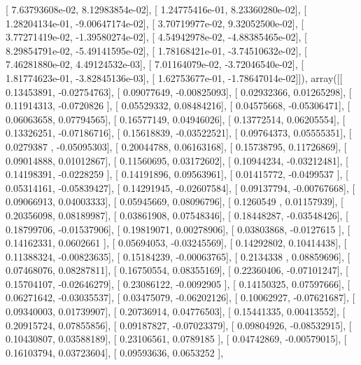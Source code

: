 \documentclass{article}
\begin{document}
       [  7.63793608e-02,   8.12983854e-02],
       [  1.24775416e-01,   8.23360280e-02],
       [  1.28204134e-01,  -9.00647174e-02],
       [  3.70719977e-02,   9.32052500e-02],
       [  3.77271419e-02,  -1.39580274e-02],
       [  4.54942978e-02,  -4.88385465e-02],
       [  8.29854791e-02,  -5.49141595e-02],
       [  1.78168421e-01,  -3.74510632e-02],
       [  7.46281880e-02,   4.49124532e-03],
       [  7.01164079e-02,  -3.72046540e-02],
       [  1.81774623e-01,  -3.82845136e-03],
       [  1.62753677e-01,  -1.78647014e-02]]), array([[ 0.13453891, -0.02754763],
       [ 0.09077649, -0.00825093],
       [ 0.02932366,  0.01265298],
       [ 0.11914313, -0.0720826 ],
       [ 0.05529332,  0.08484216],
       [ 0.04575668, -0.05306471],
       [ 0.06063658,  0.07794565],
       [ 0.16577149,  0.04946026],
       [ 0.13772514,  0.06205554],
       [ 0.13326251, -0.07186716],
       [ 0.15618839, -0.03522521],
       [ 0.09764373,  0.05555351],
       [ 0.0279387 , -0.05095303],
       [ 0.20044788,  0.06163168],
       [ 0.15738795,  0.11726869],
       [ 0.09014888,  0.01012867],
       [ 0.11560695,  0.03172602],
       [ 0.10944234, -0.03212481],
       [ 0.14198391, -0.0228259 ],
       [ 0.14191896,  0.09563961],
       [ 0.01415772, -0.0499537 ],
       [ 0.05314161, -0.05839427],
       [ 0.14291945, -0.02607584],
       [ 0.09137794, -0.00767668],
       [ 0.09066913,  0.04003333],
       [ 0.05945669,  0.08096796],
       [ 0.1260549 ,  0.01157939],
       [ 0.20356098,  0.08189987],
       [ 0.03861908,  0.07548346],
       [ 0.18448287, -0.03548426],
       [ 0.18799706, -0.01537906],
       [ 0.19819071,  0.00278906],
       [ 0.03803868, -0.0127615 ],
       [ 0.14162331,  0.0602661 ],
       [ 0.05694053, -0.03245569],
       [ 0.14292802,  0.10414438],
       [ 0.11388324, -0.00823635],
       [ 0.15184239, -0.00063765],
       [ 0.2134338 ,  0.08859696],
       [ 0.07468076,  0.08287811],
       [ 0.16750554,  0.08355169],
       [ 0.22360406, -0.07101247],
       [ 0.15704107, -0.02646279],
       [ 0.23086122, -0.0092905 ],
       [ 0.14150325,  0.07597666],
       [ 0.06271642, -0.03035537],
       [ 0.03475079, -0.06202126],
       [ 0.10062927, -0.07621687],
       [ 0.09340003,  0.01739907],
       [ 0.20736914,  0.04776503],
       [ 0.15441335,  0.00413552],
       [ 0.20915724,  0.07855856],
       [ 0.09187827, -0.07023379],
       [ 0.09804926, -0.08532915],
       [ 0.10430807,  0.03588189],
       [ 0.23106561,  0.0789185 ],
       [ 0.04742869, -0.00579015],
       [ 0.16103794,  0.03723604],
       [ 0.09593636,  0.0653252 ],
\end{document}
